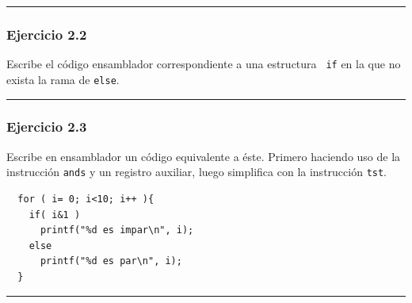 \begin{center}
\begin{myfbox}
\small
\begin{minipage}{0.92\linewidth}
\begin{center}
\colorbox[gray]{1}{\rule{0cm}{4.5cm}\rule{11cm}{0cm}}
\end{center}
\end{minipage}
\end{myfbox}
\end{center}

\subsubsection{Ejercicio 2.2}
Escribe el código ensamblador correspondiente a una estructura {\tt
if} en la que no exista la rama de {\tt else}.

\begin{center}
\begin{myfbox}
\small
\begin{minipage}{0.92\linewidth}
\begin{center}
\colorbox[gray]{1}{\rule{0cm}{4.5cm}\rule{11cm}{0cm}}
\end{center}
\end{minipage}
\end{myfbox}
\end{center}

\subsubsection{Ejercicio 2.3}

Escribe en ensamblador un código equivalente a éste. Primero
haciendo uso de la instrucción {\tt ands} y un registro auxiliar,
luego simplifica con la instrucción {\tt tst}.

\begin{center}
\begin{myfbox}
\small
\begin{minipage}{0.92\linewidth}
\begin{center}
\begin{minipage}{0.6\linewidth}
\begin{verbatim}
  for ( i= 0; i<10; i++ ){
    if( i&1 )
      printf("%d es impar\n", i);
    else
      printf("%d es par\n", i);
  }
\end{verbatim}
\end{minipage}
\end{center}
\begin{center}
\colorbox[gray]{1}{\rule{0cm}{7cm}\rule{11cm}{0cm}}
\end{center}
\end{minipage}
\end{myfbox}
\end{center}

